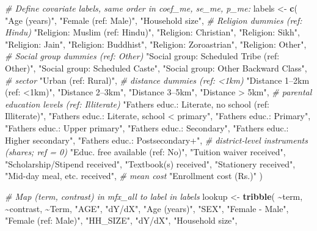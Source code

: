 \documentclass[
]{article}
\newenvironment{Shaded}{\begin{snugshade}}{\end{snugshade}}
\newcommand{\CommentTok}[1]{\textcolor[rgb]{0.56,0.35,0.01}{\textit{#1}}}
\newcommand{\FunctionTok}[1]{\textcolor[rgb]{0.13,0.29,0.53}{\textbf{#1}}}
\newcommand{\NormalTok}[1]{#1}
\newcommand{\OtherTok}[1]{\textcolor[rgb]{0.56,0.35,0.01}{#1}}
\newcommand{\SpecialCharTok}[1]{\textcolor[rgb]{0.81,0.36,0.00}{\textbf{#1}}}
\newcommand{\StringTok}[1]{\textcolor[rgb]{0.31,0.60,0.02}{#1}}
\begin{document}
\begin{Shaded}
\begin{Highlighting}[]
\CommentTok{\# Define covariate labels, same order in coef\_me, se\_me, p\_me:}
\NormalTok{labels }\OtherTok{\textless{}{-}} \FunctionTok{c}\NormalTok{(}
  \StringTok{"Age (years)"}\NormalTok{,}
  \StringTok{"Female (ref: Male)"}\NormalTok{,}
  \StringTok{"Household size"}\NormalTok{,}
  \CommentTok{\# Religion dummies (ref: Hindu)}
  \StringTok{"Religion: Muslim (ref: Hindu)"}\NormalTok{,}
  \StringTok{"Religion: Christian"}\NormalTok{,}
  \StringTok{"Religion: Sikh"}\NormalTok{,}
  \StringTok{"Religion: Jain"}\NormalTok{,}
  \StringTok{"Religion: Buddhist"}\NormalTok{,}
  \StringTok{"Religion: Zoroastrian"}\NormalTok{,}
  \StringTok{"Religion: Other"}\NormalTok{,}
  \CommentTok{\# Social group dummies (ref: Other)}
  \StringTok{"Social group: Scheduled Tribe (ref: Other)"}\NormalTok{,}
  \StringTok{"Social group: Scheduled Caste"}\NormalTok{,}
  \StringTok{"Social group: Other Backward Class"}\NormalTok{,}
  \CommentTok{\# sector}
  \StringTok{"Urban (ref: Rural)"}\NormalTok{,}
  \CommentTok{\# distance dummies (ref: \textless{}1km)}
  \StringTok{"Distance 1–2km (ref: \textless{}1km)"}\NormalTok{,}
  \StringTok{"Distance 2–3km"}\NormalTok{,}
  \StringTok{"Distance 3–5km"}\NormalTok{,}
  \StringTok{"Distance \textgreater{} 5km"}\NormalTok{,}
  \CommentTok{\# parental education levels (ref: Illiterate)}
  \StringTok{"Father\textquotesingle{}s educ.: Literate, no school (ref: Illiterate)"}\NormalTok{,}
  \StringTok{"Father\textquotesingle{}s educ.: Literate, school \textless{} primary"}\NormalTok{,}
  \StringTok{"Father\textquotesingle{}s educ.: Primary"}\NormalTok{,}
  \StringTok{"Father\textquotesingle{}s educ.: Upper primary"}\NormalTok{,}
  \StringTok{"Father\textquotesingle{}s educ.: Secondary"}\NormalTok{,}
  \StringTok{"Father\textquotesingle{}s educ.: Higher secondary"}\NormalTok{,}
  \StringTok{"Father\textquotesingle{}s educ.: Postsecondary+"}\NormalTok{,}
  \CommentTok{\# district‐level instruments (shares; ref = 0)}
  \StringTok{"Educ. free available (ref: No)"}\NormalTok{,}
  \StringTok{"Tuition waiver received"}\NormalTok{,}
  \StringTok{"Scholarship/Stipend received"}\NormalTok{,}
  \StringTok{"Textbook(s) received"}\NormalTok{,}
  \StringTok{"Stationery received"}\NormalTok{,}
  \StringTok{"Mid{-}day meal, etc. received"}\NormalTok{,}
  \CommentTok{\# mean cost}
  \StringTok{"Enrollment cost (Rs.)"}
\NormalTok{)}



\CommentTok{\# Map (term, contrast) in mfx\_all to label in labels}
\NormalTok{lookup }\OtherTok{\textless{}{-}} \FunctionTok{tribble}\NormalTok{(}
  \SpecialCharTok{\textasciitilde{}}\NormalTok{term, }\SpecialCharTok{\textasciitilde{}}\NormalTok{contrast, }\SpecialCharTok{\textasciitilde{}}\NormalTok{Term,}
  \StringTok{"AGE"}\NormalTok{, }\StringTok{"dY/dX"}\NormalTok{, }\StringTok{"Age (years)"}\NormalTok{,}
  \StringTok{"SEX"}\NormalTok{, }\StringTok{"Female {-} Male"}\NormalTok{, }\StringTok{"Female (ref: Male)"}\NormalTok{,}
  \StringTok{"HH\_SIZE"}\NormalTok{, }\StringTok{"dY/dX"}\NormalTok{, }\StringTok{"Household size"}\NormalTok{,}


\end{Highlighting}
\end{Shaded}
\end{document}
